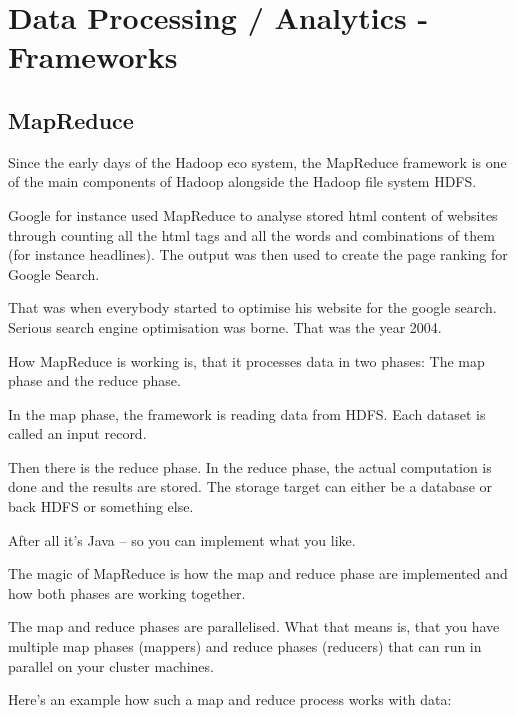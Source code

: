 \documentclass[12pt, numbers=noenddot]{scrreprt} %
\begin{document}
\chapter{Data Processing / Analytics - Frameworks}
\section{MapReduce}

Since the early days of the Hadoop eco system, the MapReduce framework is one of the main components of Hadoop alongside the Hadoop file system HDFS.

Google for instance used MapReduce to analyse stored html content of websites through counting all the html tags and all the words and combinations of them (for instance headlines). The output was then used to create the page ranking for Google Search.

That was when everybody started to optimise his website for the google search. Serious search engine optimisation was borne. That was the year 2004.

How MapReduce is working is, that it processes data in two phases: The map phase and the reduce phase.

In the map phase, the framework is reading data from HDFS. Each dataset is called an input record.

Then there is the reduce phase. In the reduce phase, the actual computation is done and the results are stored. The storage target can either be a database or back HDFS or something else.

After all it’s Java – so you can implement what you like.

The magic of MapReduce is how the map and reduce phase are implemented and how both phases are working together.

The map and reduce phases are parallelised. What that means is, that you have multiple map phases (mappers) and reduce phases (reducers) that can run in parallel on your cluster machines.

Here's an example how such a map and reduce process works with data:
\end{document}
